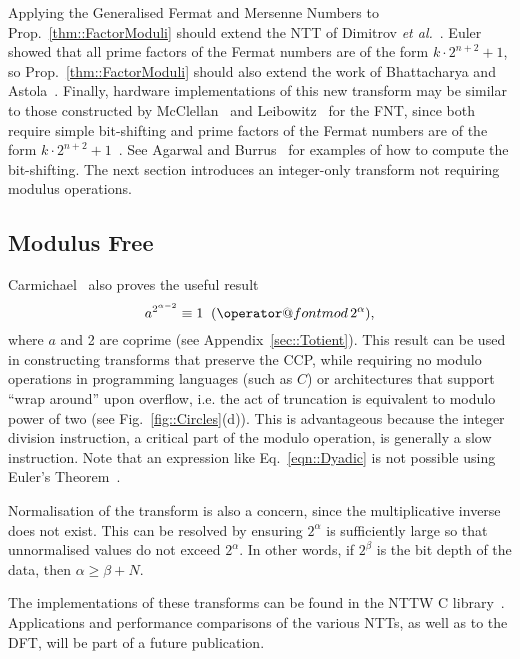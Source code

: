 \documentclass[twocolumn]{IEEEtran}
\makeatletter
\def\imod#1{\allowbreak\mkern10mu({\operator@font mod}\,#1)}
\newcommand{\eqnTag}{Eq.}
\newcommand{\figTag}{Fig.}
\newcommand{\secTag}{Sec.}
\newcommand{\propTag}{Prop.}
\makeatother
\begin{document}
Applying the Generalised Fermat and Mersenne Numbers to \propTag~\ref{thm::FactorModuli} should extend the \ac{NTT} of Dimitrov \emph{et al.}~\citep{Dimitrov1994}. Euler~\citep{Euler1732} showed that all prime factors of the Fermat numbers are of the form $k\cdot 2^{n+2}+1$, so \propTag~\ref{thm::FactorModuli} should also extend the work of Bhattacharya and Astola~\citep{Bhattacharya2000}. Finally, hardware implementations of this new transform may be similar to those constructed by McClellan~\citep{McClellan1976} and Leibowitz~\citep{Leibowitz1976} for the \ac{FNT}, since both require simple bit-shifting and prime factors of the Fermat numbers are of the form $k\cdot 2^{n+2}+1$~\citep{Euler1732}. See Agarwal and Burrus~\citep[\secTag VI.E]{Agarwal1974} for examples of how to compute the bit-shifting. The next section introduces an integer-only transform not requiring modulus operations.


\subsection{Modulus Free}
Carmichael~\citep{Carmichael1910} also proves the useful result
\begin{equation}\label{eqn::Dyadic}
a^{2^{\alpha-2}} \equiv 1 \imod {2^\alpha},
\end{equation}
where $a$ and 2 are coprime (see Appendix~\ref{sec::Totient}). This result can be used in constructing transforms that preserve the \ac{CCP}, while requiring no modulo operations in programming languages (such as $C$) or architectures that support ``wrap around'' upon overflow, i.e. the act of truncation is equivalent to modulo power of two (see \figTag~\ref{fig::Circles}(d)). This is advantageous because the integer division instruction, a critical part of the modulo operation, is generally a slow instruction. Note that an expression like \eqnTag~\eqref{eqn::Dyadic} is not possible using Euler's Theorem~\citep{Carmichael1910}.

Normalisation of the transform is also a concern, since the multiplicative inverse does not exist. This can be resolved by ensuring $2^\alpha$ is sufficiently large so that unnormalised values do not exceed $2^\alpha$. In other words, if $2^\beta$ is the bit depth of the data, then $\alpha \geqslant \beta + N$. 

The implementations of these transforms can be found in the NTTW C library~\citep{Chandra2009b}. Applications and performance comparisons of the various \acp{NTT}, as well as to the \ac{DFT}, will be part of a future publication.
\end{document}
